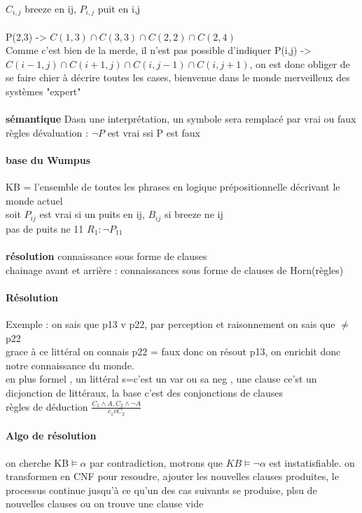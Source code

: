 \documentclass{article}
\begin{document}
\paragraph{}
$C_{i,j}$ breeze en ij, $P_{i,j}$ puit en i,j\\\\
P(2,3) -> $C(1,3)\cap C(3,3)\cap C(2,2)\cap C(2,4)$\\
Comme c'est bien de la merde, il n'est pas possible d'indiquer P(i,j) -> $C(i-1,j)\cap C(i+1,j)\cap C(i,j-1)\cap C(i,j+1)$, on est donc obliger de se faire chier à décrire toutes les cases, bienvenue dans le monde merveilleux des systèmes "expert"\\\\\textbf{sémantique} Dasn une interprétation, un symbole sera remplacé par vrai ou faux\\règles dévaluation : $\neg P$ est vrai ssi P est faux
\paragraph{base du Wumpus}
KB = l'ensemble de toutes les phrases en logique prépositionnelle décrivant le monde actuel\\soit $P_{ij}$ est vrai si un puits en ij, $B_{ij}$ si breeze ne ij\\pas de puits ne 11 $R_1 : \neg P_{11}$ \\\\\textbf{résolution} connaissance sous forme de clauses\\chainage avant et arrière : connaissances sous forme de clauses de Horn(règles)
\paragraph{Résolution} Exemple : on sais que p13 v p22, par perception et raisonnement on sais que $\neq$p22\\grace à ce littéral on connais p22 = faux donc on résout p13, on enrichit donc notre connaissance du monde.\\en plus formel , un littéral s=c'est un var ou sa neg , une clause ce'st un dicjonction de littéraux, la base c'est des conjonctions de clauses\\règles de déduction $ \frac{C_1 \wedge A , C_2 \wedge \neg A}{c_1 v C_2}$
\paragraph{Algo de résolution} on cherche KB$\models \alpha$ par contradiction, motrons que $KB\models \neg \alpha$ est instatisfiable. on transformen en CNF pour resoudre, ajouter les nouvelles clauses produites, le processus continue jusqu'à ce qu'un des cas suivants se produise, plsu de nouvelles clauses ou on trouve une clause vide
\end{document}
